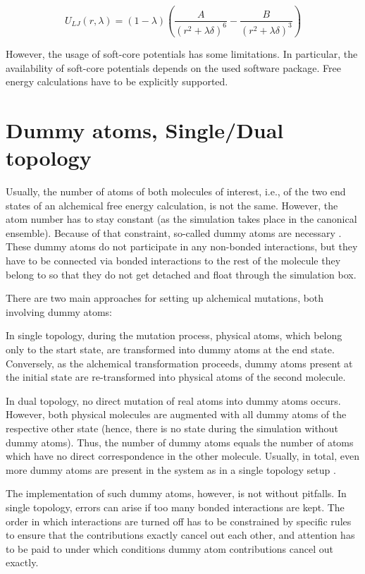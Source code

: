 \begin{equation}
U_{LJ}\left(r,\lambda\right)=\left(1-\lambda\right)\left(\frac{A}{\left(r^{2}+\lambda\delta\right)^{6}}-\frac{B}{\left(r^{2}+\lambda\delta\right)^{3}}\right)
\end{equation}

However, the usage of soft-core potentials has some limitations. In
particular, the availability of soft-core potentials depends on the
used software package. Free energy calculations have to be explicitly
supported. 

\section{Dummy atoms, Single/Dual topology}

Usually, the number of atoms of both molecules of interest, i.e., of the
two end states of an alchemical free energy calculation, is not
the same. However, the atom number has to stay constant (as the simulation
takes place in the canonical ensemble). Because of that constraint,
so-called dummy atoms are necessary \cite{Fleck.2021}. These dummy
atoms do not participate in any non-bonded interactions, but they
have to be connected via bonded interactions to the rest of the molecule
they belong to so that they do not get detached and float through
the simulation box.

There are two main approaches for setting up alchemical mutations, both involving dummy atoms: 

In single topology, during the mutation process, physical atoms, which belong only to the start state, are
transformed into dummy atoms at the end state. Conversely, 
as the alchemical transformation proceeds, dummy atoms present at the initial state are re-transformed
into physical atoms of the second molecule.

In dual topology, no direct mutation of real atoms into dummy atoms
occurs. However, both physical molecules are augmented with all dummy
atoms of the respective other state (hence, there is no state during the simulation
without dummy atoms). Thus, the number of dummy atoms equals the number
of atoms which have no direct correspondence in the other molecule.
Usually, in total, even more dummy atoms are present in the system
as in a single topology setup \cite{Fleck.2021}.

The implementation of such dummy atoms, however, is not without pitfalls.
In single topology, errors can arise if too many bonded interactions are kept. The order in which interactions are turned off has to be constrained
by specific rules to ensure that the contributions exactly cancel
out each other, and attention has to be paid to under which conditions
dummy atom contributions cancel out exactly. \cite{Fleck.2021}

